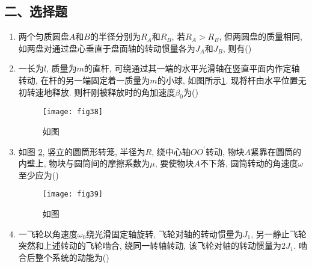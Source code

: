 \subsection*{二、选择题}
\begin{enumerate}
    \item 两个匀质圆盘$A$和$B$的半径分别为$R_A$和$R_B$, 若$R_A>R_B$, 但两圆盘的质量相同, 如两盘对通过盘心垂直于盘面轴的转动惯量各为$J_A$和$J_B$, 则有(\hspace{1pc})
    \item 一长为$l$, 质量为$m$的直杆, 可绕通过其一端的水平光滑轴在竖直平面内作定轴转动, 在杆的另一端固定着一质量为$m$的小球, 如图所示\ref{fig:38}. 
    现将杆由水平位置无初转速地释放. 则杆刚被释放时的角加速度$\beta_0$为(\hspace{1pc})
    \begin{figure}[H]
        \centering
        \texttt{[image: fig38]}
            \caption{如图}\label{fig:38}
    \end{figure}
    \item 如图 \ref{fig:39}, 竖立的圆筒形转笼, 半径为$R$, 绕中心轴$OO^{'}$转动, 物块$A$紧靠在圆筒的内壁上, 物块与圆筒间的摩擦系数为$\mu$, 要使物块$A$不下落, 
    圆筒转动的角速度$\omega$至少应为(\hspace{1pc})
    \begin{figure}[H]
        \centering
        \texttt{[image: fig39]}
            \caption{如图}\label{fig:39}
    \end{figure}
    \item 一飞轮以角速度$\omega_0$绕光滑固定轴旋转, 飞轮对轴的转动惯量为$J_1$, 另一静止飞轮突然和上述转动的飞轮啮合, 绕同一转轴转动, 该飞轮对轴的转动惯量为$2J_1$. 
    啮合后整个系统的动能为(\hspace{1pc})

\end{enumerate}
